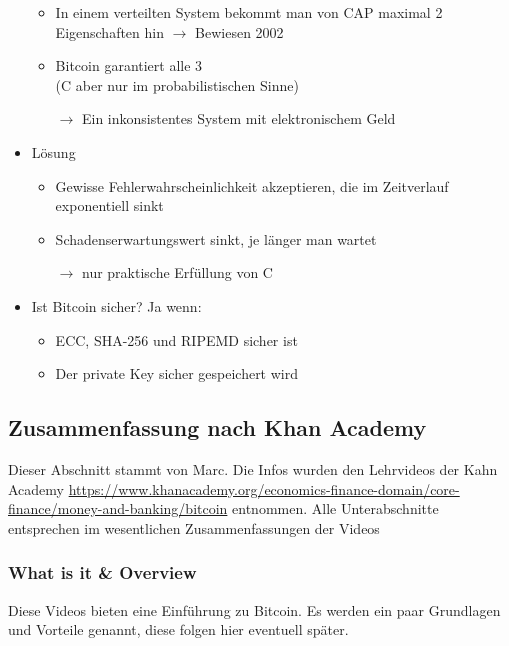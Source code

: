 \documentclass{article} %
\begin{document}
\begin{itemize}
\begin{enumerate}
			\end{enumerate}
			\begin{itemize}
				\item In einem verteilten System bekommt man von CAP maximal 2 Eigenschaften hin $\rightarrow$ Bewiesen 2002
				\item Bitcoin garantiert alle 3 \\
				(C aber nur im probabilistischen Sinne)
				\item[$\rightarrow$] Ein inkonsistentes System mit elektronischem Geld
			\end{itemize}
			\item Lösung
			\begin{itemize}
				\item Gewisse Fehlerwahrscheinlichkeit akzeptieren, die im Zeitverlauf exponentiell sinkt
				\item Schadenserwartungswert sinkt, je länger man wartet
				\item[$\rightarrow$] nur praktische Erfüllung von C
			\end{itemize}
			\item Ist Bitcoin sicher? Ja wenn:
			\begin{itemize}
				\item ECC, SHA-256 und RIPEMD sicher ist
				\item Der private Key sicher gespeichert wird
			\end{itemize}
		\end{itemize}
	\subsection{Zusammenfassung nach Khan Academy}
	Dieser Abschnitt stammt von Marc.
	Die Infos wurden den Lehrvideos der Kahn Academy \url{https://www.khanacademy.org/economics-finance-domain/core-finance/money-and-banking/bitcoin} entnommen.
	Alle Unterabschnitte entsprechen im wesentlichen Zusammenfassungen der Videos
	\subsubsection{What is it \& Overview}
	Diese Videos bieten eine Einführung zu Bitcoin.
	Es werden ein paar Grundlagen und Vorteile genannt, diese folgen hier eventuell später.
\end{document}
